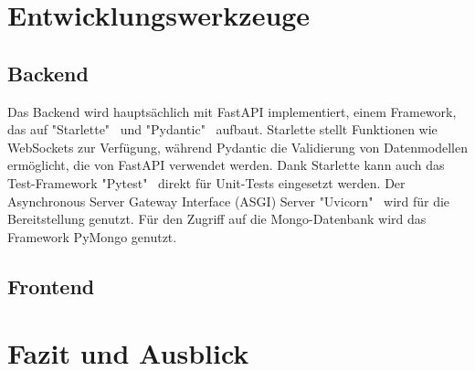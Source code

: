 \documentclass[a4paper, 10pt, conference]{IEEEtran}
\begin{document}
\section{Entwicklungswerkzeuge}\label{sec:entwicklungswerkzeuge}



\subsection{Backend}\label{subsec:backend-dev-tools}
Das Backend wird hauptsächlich mit FastAPI implementiert, einem Framework, das auf "Starlette"~\cite{starlette} und "Pydantic"~\cite{pydantic} aufbaut. Starlette stellt Funktionen wie WebSockets zur Verfügung, während Pydantic die Validierung von Datenmodellen ermöglicht, die von FastAPI verwendet werden. Dank Starlette kann auch das Test-Framework "Pytest"~\cite{pytest} direkt für Unit-Tests eingesetzt werden. Der Asynchronous Server Gateway Interface (ASGI) Server "Uvicorn"~\cite{unvicorn} wird für die Bereitstellung genutzt.
Für den Zugriff auf die Mongo-Datenbank wird das Framework PyMongo genutzt. 




\subsection{Frontend}\label{subsec:frontend-dev-tools}



\section{Fazit und Ausblick}\label{sec:fazit}




\printbibliography
\end{document}
